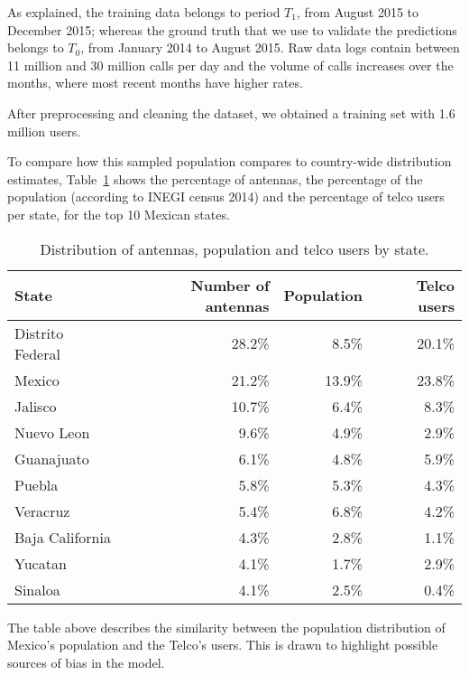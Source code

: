 As explained, the training data belongs to period $T_1$, from August 2015 to December 2015;
whereas the ground truth that we use to validate the predictions belongs to $T_0$, from January 2014 to August 2015. Raw data logs contain between 11 million and 30 million calls per day and the volume of calls increases over the months, where most recent months have higher rates.

After preprocessing and cleaning the dataset, we obtained 
a training set with 1.6 million users.

To compare how this sampled population compares to country-wide distribution estimates,
Table~\cref{tab:distribution_by_state} shows the percentage of antennas, the percentage of the population (according to INEGI census 2014) and
the percentage of telco users per state, for the top 10 Mexican states.


\begin{table}[ht]
	\caption{Distribution of antennas, population and telco users by state.}
	\label{tab:distribution_by_state}
	\centering
	\begin{tabular}{l r r r}
		\toprule
		State				& Number of antennas & Population 	& Telco users \\
		\midrule
		Distrito Federal      & 28.2\% 	& 8.5\%		& 20.1\%   \\
		Mexico                     & 21.2\%		&   13.9\% 	& 23.8\%   \\
		Jalisco                   & 10.7\% 	& 6.4\%		& 8.3\%    \\
		Nuevo Leon               & 9.6\%	& 4.9\%		& 2.9\% \\
		Guanajuato               & 6.1\%	& 4.8\%		& 5.9\% \\
		Puebla                     & 5.8\%	& 5.3\%		& 4.3\% \\
		Veracruz                  & 5.4\% 	& 6.8\%		& 4.2\% \\
		Baja California       & 4.3\%	& 2.8\%		& 1.1\% \\
		Yucatan                   & 4.1\%	& 1.7\%		& 2.9\% \\
		Sinaloa                   & 4.1\%	& 2.5\%		& 0.4\% \\
		\bottomrule
	\end{tabular}
\end{table}

The table above describes the similarity between the population distribution of Mexico's population and the Telco's users. This is drawn to highlight possible sources of bias in the model.


